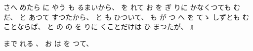 さへ
めたら
に
やう
も
るまいから、
%
を
れて
お
を
ぎ
りに
かなくつても
む
だ、
%
と
あつて
すつたから、
%
と
も
ひついて、
%
も
が
つ
へ
を
てゝ
しずとも
むことならば、
%
と
の
の
を%
りに
くことだけは
ひ
まつたが、
』

まで
れる
、
%
お
は
を
つて、

